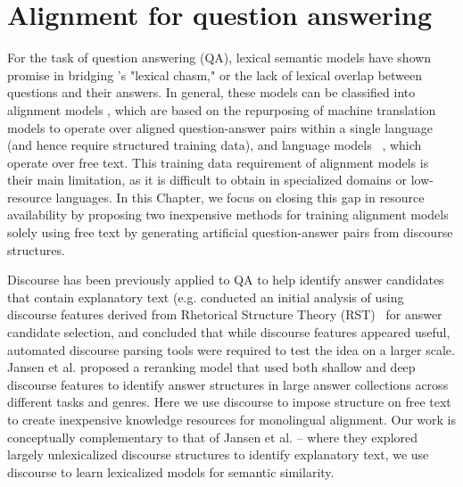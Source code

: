 

\section{Alignment for question answering}
\label{sec-naacl2015:intro}


For the task of question answering (QA), lexical semantic models have shown promise in bridging \citet{Berger:00}'s "lexical chasm," or the lack of lexical overlap between questions and their answers.  In general, these models can be classified into alignment models \citep{echihabi2003noisy,Soricut:06,Riezler:etal:2007,Surdeanu:11,yao2013}, which are based on the repurposing of machine translation models to operate over aligned question-answer pairs within a single language (and hence require structured training data), and language models ~\citep{jansen14,sultan-etal:2014:TACL,yih13}, which operate over free text.  
This training data requirement of alignment models is their main limitation, as it is difficult to obtain in specialized domains or low-resource languages.
In this Chapter, we focus on closing this gap in resource availability by proposing two inexpensive methods for training alignment models solely using free text by generating artificial question-answer pairs from discourse structures. 

Discourse has been previously applied to QA to help identify answer candidates that contain explanatory text (e.g. \citet{Verberne:2007}  conducted an initial analysis of using discourse features derived from Rhetorical Structure Theory (RST)~\cite{mann88} for answer candidate selection, and concluded that while discourse features appeared useful, automated discourse parsing tools were required to test the idea on a larger scale.  
Jansen et al. \citeyear{jansen14} proposed a reranking model that used both shallow and deep discourse features to identify answer structures in large answer collections across different tasks and genres.  Here we use discourse to impose structure on free text to create inexpensive knowledge resources for monolingual alignment. Our work is conceptually complementary to that of Jansen et al. -- where they explored largely unlexicalized discourse structures to identify explanatory text, we use discourse to learn lexicalized models for semantic similarity.

